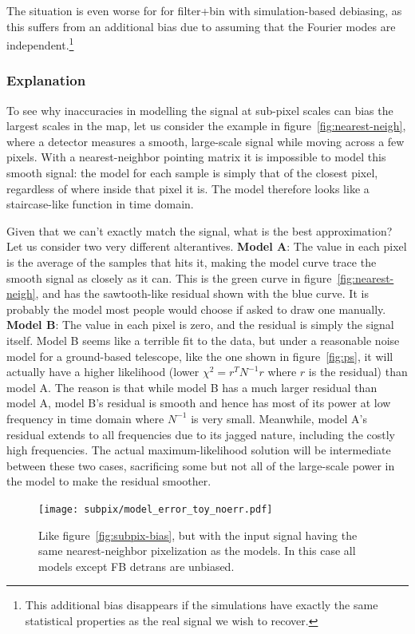 \documentclass{aa}
\newcommand{\dfn}[1]{\textbf{#1}}
\begin{document}
The situation is even worse for for filter+bin with simulation-based debiasing,
as this suffers from an additional bias due to assuming that the Fourier modes
are independent.\footnote{This additional bias disappears if the simulations
have exactly the same statistical properties as the real signal we wish to
recover.}

\subsubsection{Explanation}
To see why inaccuracies in modelling the signal at sub-pixel scales can bias
the largest scales in the map, let us consider the example in figure~\ref{fig:nearest-neigh},
where a detector measures a smooth, large-scale signal while moving across a few
pixels. With a nearest-neighbor pointing matrix it is impossible to model this
smooth signal: the model for each sample is simply that of the closest pixel,
regardless of where inside that pixel it is. The model therefore looks like
a staircase-like function in time domain.

Given that we can't exactly match the signal, what is the best approximation?
Let us consider two very different alterantives. \dfn{Model A}: The value in each pixel
is the average of the samples that hits it, making the model curve trace the
smooth signal as closely as it can. This is the green curve in figure~\ref{fig:nearest-neigh},
and has the sawtooth-like residual shown with the blue curve. It is probably the
model most people would choose if asked to draw one manually.
\dfn{Model B}: The value in each pixel is zero, and the residual is simply the signal itself.
Model B seems like a terrible fit to the data, but under a reasonable noise model
for a ground-based telescope, like the one shown in figure~\ref{fig:ps}, it
will actually have a higher likelihood (lower $\chi^2 = r^TN^{-1}r$
where $r$ is the residual) than model A. The reason is that while model B has a much
larger residual than model A, model B's residual is smooth and hence has most of its
power at low frequency in time domain where $N^{-1}$ is very small. Meanwhile, model A's
residual extends to all frequencies due to its jagged nature, including the costly high
frequencies. The actual maximum-likelihood solution will be intermediate between these
two cases, sacrificing some but not all of the large-scale power in the model to make
the residual smoother.

\begin{figure}
	\centering
	\hspace*{-5mm}\texttt{[image: subpix/model\_error\_toy\_noerr.pdf]}
	\caption{
		Like figure~\ref{fig:subpix-bias}, but with the input signal
		having the same nearest-neighbor pixelization as the models.
		In this case all models except FB detrans are unbiased.
	}
	\label{fig:subpix-noerr}
\end{figure}
\end{document}
